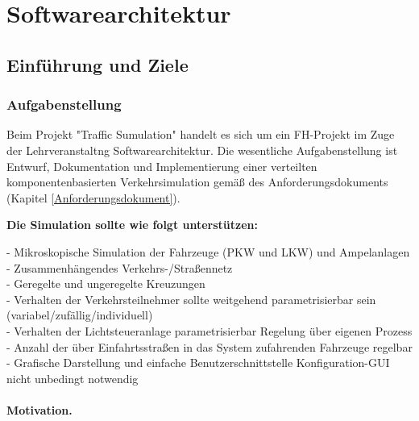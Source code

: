 \documentclass[12pt,a4paper,bibliography=totocnumbered,listof=totocnumbered]{scrartcl}
\begin{document}
%


\section{Softwarearchitektur}
\sloppy
\subsection{Einführung und Ziele}
\subsubsection{Aufgabenstellung} \label{Aufgabenstellung}
Beim Projekt "Traffic Sumulation" handelt es sich um ein FH-Projekt im Zuge der Lehrveranstaltng Softwarearchitektur. Die wesentliche Aufgabenstellung ist Entwurf, Dokumentation und Implementierung einer verteilten komponentenbasierten Verkehrsimulation gemäß des Anforderungsdokuments (Kapitel \ref{Anforderungsdokument}).

\textbf{Die Simulation sollte wie folgt unterstützen:}

- Mikroskopische Simulation der Fahrzeuge (PKW und LKW) und Ampelanlagen \\
- Zusammenhängendes Verkehrs-/Straßennetz \\
- Geregelte und ungeregelte Kreuzungen \\
- Verhalten der Verkehrsteilnehmer sollte weitgehend parametrisierbar sein (variabel/zufällig/individuell) \\
- Verhalten der Lichtsteueranlage parametrisierbar Regelung über eigenen Prozess \\
- Anzahl der über Einfahrtsstraßen in das System zufahrenden Fahrzeuge regelbar \\
- Grafische Darstellung und einfache Benutzerschnittstelle Konfiguration-GUI nicht unbedingt notwendig \\
 \\
\textbf{Motivation.}
\end{document}
